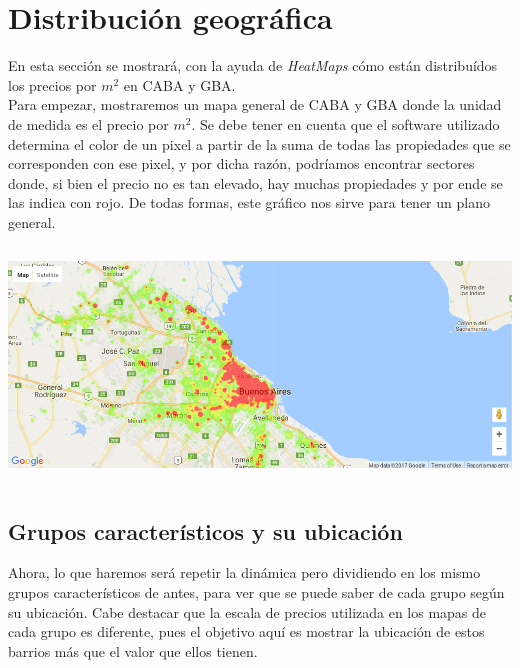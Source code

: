 \documentclass[a4paper, 10pt]{article}
\newcommand\tab[1][0.5cm]{\hspace*{#1}}
\begin{document}
		\section{Distribución geográfica}
			En esta sección se mostrará, con la ayuda de \emph{HeatMaps} cómo están distribuídos los precios por $m^2$ en CABA
			y GBA. \\
			\tab Para empezar, mostraremos un mapa general de CABA y GBA donde la unidad de medida es el precio por $m^2$. Se
			debe tener en cuenta que el software utilizado determina el color de un pixel a partir de la suma de todas las
			propiedades que se corresponden con ese pixel, y por dicha razón, podríamos encontrar sectores donde, si bien el
			precio no es tan elevado, hay muchas propiedades y por ende se las indica con rojo. De todas formas, este gráfico
			nos sirve para tener un plano general.
			\begin{center}
				\includegraphics[width=6in, height=2.46in]{images/m2GeneralHeatMap}
		  	\end{center}
			\subsection{Grupos característicos y su ubicación}			
				Ahora, lo que haremos será repetir la dinámica pero dividiendo en los mismo grupos característicos de antes, para
				ver que se puede saber de cada grupo según su ubicación. Cabe destacar que la escala de precios utilizada en los
				mapas de cada grupo es diferente, pues el objetivo aquí es mostrar la ubicación de estos barrios más que el valor
				que ellos tienen.
\end{document}
